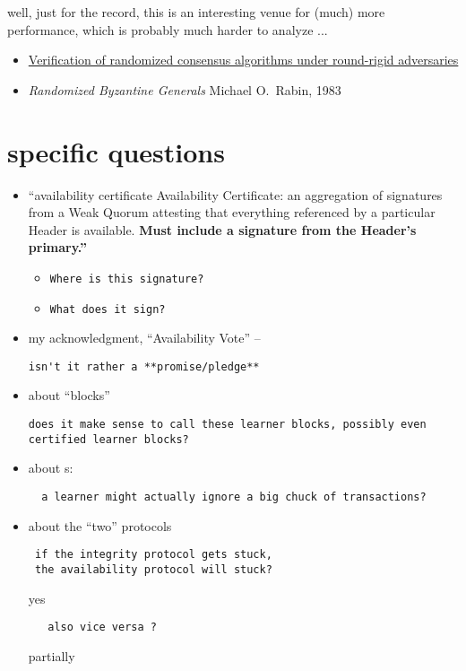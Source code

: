 \documentclass{article}
\theoremstyle{definition}
\newcommand{\anItemInline}[6][theNode]{%
  \tikz[baseline={([yshift=0pt]#1.base)},remember picture]{%
    \node[#2,fill=#3,draw=#4,inner sep=.5pt,outer sep=0pt] %
    (#1){%
      \textcolor{#5}{%
        \footnotesize #6%
      }%
    };%
  }%
}
\newcommand{\tx}[1][theTX]{%
  \anItemInline[#1]%
  {ellipse}%
  {black}%
  {none}%
  {white}%
  {\bf TX}%
}
\begin{document}
well, just for the record,
this is an interesting venue for (much) more performance,
which is probably much harder to analyze ... 
\begin{itemize}
\item \href{https://link.springer.com/article/10.1007/s10009-020-00603-x}{Verification of randomized consensus algorithms under round-rigid adversaries}
\item \emph{Randomized Byzantine Generals} Michael O.~Rabin,  1983
\end{itemize}





\section{specific questions}
\begin{itemize}
\item 
  “availability certificate Availability Certificate: an aggregation of signatures from a Weak Quorum attesting that everything referenced by a particular Header is available. \bf Must include a signature from the Header's primary.”
  \begin{itemize}
  \item
\begin{verbatim}
Where is this signature?
\end{verbatim}
  \item
\begin{verbatim}
What does it sign?
\end{verbatim}




  \end{itemize}
\item my acknowledgment, “Availability Vote” --
\begin{verbatim}
isn't it rather a **promise/pledge**
\end{verbatim}
\item about ``blocks'' 
\begin{verbatim}
does it make sense to call these learner blocks, possibly even certified learner blocks?
\end{verbatim}
\item about \tx{s}: 
\begin{verbatim}
  a learner might actually ignore a big chuck of transactions?
\end{verbatim}
\item about the ``two'' protocols
\begin{verbatim}
 if the integrity protocol gets stuck, 
 the availability protocol will stuck?
\end{verbatim}
yes
\begin{verbatim}
   also vice versa ? 
\end{verbatim}
partially 


\end{itemize}
\end{document}
